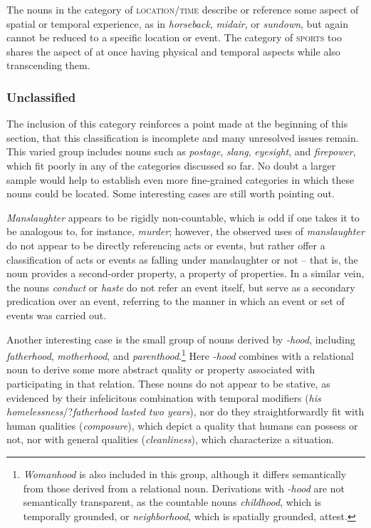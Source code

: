 \documentclass[output=paper]{langscibook}
\begin{document}
The nouns in the category of \textsc{location/time} describe or reference some aspect of spatial or temporal experience, as in \textit{horseback},  \textit{midair}, or \textit{sundown}, but again cannot be reduced to a specific location or event.  The category of \textsc{sports} too shares the aspect of at once having physical and temporal aspects while also transcending them.  


\subsubsection{Unclassified}  The inclusion of this category  reinforces a point made at the beginning of this section, that this classification is incomplete and many unresolved issues remain.  This varied group  includes nouns such as \textit{postage}, \textit{slang}, \textit{eyesight}, and \textit{firepower}, which fit poorly in any of the categories discussed so far.  No doubt a larger sample would help to establish even more fine-grained categories in which these nouns could be located.  Some interesting cases are still worth pointing out.  

\textit{Manslaughter} appears to be rigidly non-countable, which is odd if one takes it to be analogous to, for instance, \textit{murder}; however, the observed uses of \textit{manslaughter} do not appear to be directly referencing acts or events, but rather offer a classification of acts or events as falling under manslaughter or not -- that is, the noun provides a second-order property, a property of properties. In a similar vein, the nouns \textit{conduct} or \textit{haste} do not refer an event itself, but serve as a secondary predication over an event, referring to the manner in which an event or set of events was carried out.





Another interesting case is the small group of nouns derived by \textit{-hood}, including \textit{fatherhood}, \textit{motherhood}, and \textit{parenthood}.\footnote{\textit{Womanhood} is also included in this group, although it differs semantically from those derived from a relational noun.  Derivations with \textit{-hood} are not semantically transparent, as the countable nouns \textit{childhood}, which is temporally grounded, or \textit{neighborhood}, which is spatially grounded, attest.}  Here \textit{-hood} combines with a relational noun to derive some more abstract quality or property associated with participating in that relation.  These nouns do not appear to be stative, as evidenced by their infelicitous combination with temporal modifiers (\textit{his homelessness}/?\textit{fatherhood lasted two years}), nor do they straightforwardly fit with human qualities (\textit{composure}), which depict a quality that humans can possess or not, nor with general qualities (\textit{cleanliness}), which characterize a situation. %
\end{document}
